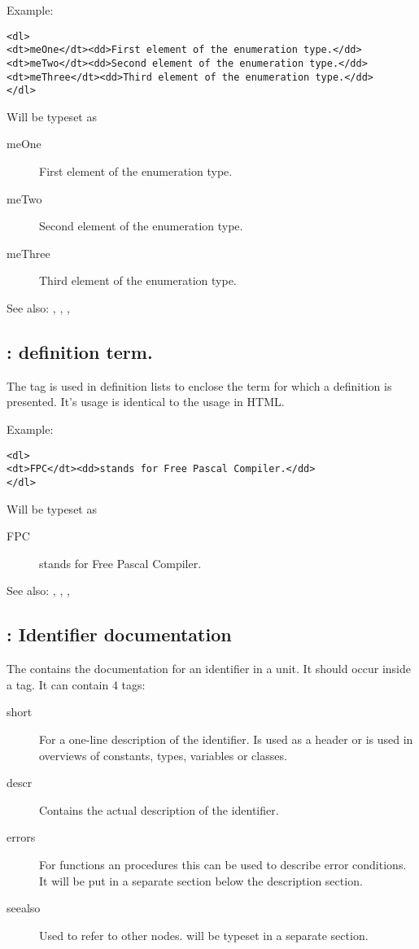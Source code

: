 Example:
\begin{verbatim}
<dl>
<dt>meOne</dt><dd>First element of the enumeration type.</dd>
<dt>meTwo</dt><dd>Second element of the enumeration type.</dd>
<dt>meThree</dt><dd>Third element of the enumeration type.</dd>
</dl>
\end{verbatim}
Will be typeset as
\begin{description}
\item[meOne] First element of the enumeration type.
\item[meTwo] Second element of the enumeration type.
\item[meThree] Third element of the enumeration type.
\end{description}

See also: , , , 

\subsection{ : definition term.}
\label{tag:dt}
The  tag is used in definition lists to enclose the term for which a
definition is presented. It's usage is identical to the usage in HTML.

Example:
\begin{verbatim}
<dl>
<dt>FPC</dt><dd>stands for Free Pascal Compiler.</dd>
</dl>
\end{verbatim}
Will be typeset as
\begin{description}
\item[FPC] stands for Free Pascal Compiler.
\end{description}

See also: , , , 


\subsection{ : Identifier documentation}
\label{tag:element}
The  contains the documentation for an identifier in a unit. It
should occur inside a  tag. It can contain 4 tags:
\begin{description}
\item[short] For a one-line description of the identifier. Is used as a
header or is used in overviews of constants, types, variables or classes.
\item[descr] Contains the actual description of the identifier.
\item[errors] For functions an procedures this can be used to describe error
conditions. It will be put in a separate section below the description
section.
\item[seealso] Used to refer to other nodes. will be typeset in a separate
section.
\end{description}


